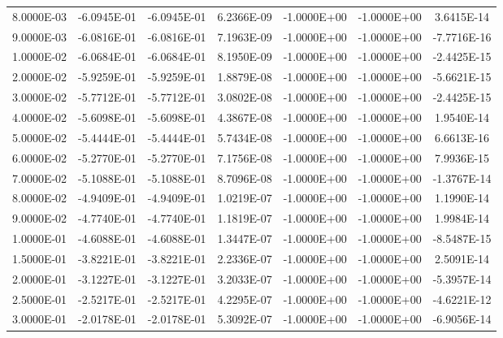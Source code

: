 \documentclass[12pt,letterpaper,reqno]{article}
\numberwithin{equation}{section}
\begin{document}
{\begin{tabular}{|c|c|c|c|c|c|c|}
 8.0000E-03     & -6.0945E-01     & -6.0945E-01     &  6.2366E-09     & -1.0000E+00     & -1.0000E+00     &  3.6415E-14    \\ 
 9.0000E-03     & -6.0816E-01     & -6.0816E-01     &  7.1963E-09     & -1.0000E+00     & -1.0000E+00     & -7.7716E-16    \\ 
 1.0000E-02     & -6.0684E-01     & -6.0684E-01     &  8.1950E-09     & -1.0000E+00     & -1.0000E+00     & -2.4425E-15    \\ 
 2.0000E-02     & -5.9259E-01     & -5.9259E-01     &  1.8879E-08     & -1.0000E+00     & -1.0000E+00     & -5.6621E-15    \\ 
 3.0000E-02     & -5.7712E-01     & -5.7712E-01     &  3.0802E-08     & -1.0000E+00     & -1.0000E+00     & -2.4425E-15    \\ 
 4.0000E-02     & -5.6098E-01     & -5.6098E-01     &  4.3867E-08     & -1.0000E+00     & -1.0000E+00     &  1.9540E-14    \\ 
 5.0000E-02     & -5.4444E-01     & -5.4444E-01     &  5.7434E-08     & -1.0000E+00     & -1.0000E+00     &  6.6613E-16    \\ 
 6.0000E-02     & -5.2770E-01     & -5.2770E-01     &  7.1756E-08     & -1.0000E+00     & -1.0000E+00     &  7.9936E-15    \\ 
 7.0000E-02     & -5.1088E-01     & -5.1088E-01     &  8.7096E-08     & -1.0000E+00     & -1.0000E+00     & -1.3767E-14    \\ 
 8.0000E-02     & -4.9409E-01     & -4.9409E-01     &  1.0219E-07     & -1.0000E+00     & -1.0000E+00     &  1.1990E-14    \\ 
 9.0000E-02     & -4.7740E-01     & -4.7740E-01     &  1.1819E-07     & -1.0000E+00     & -1.0000E+00     &  1.9984E-14    \\ 
 1.0000E-01     & -4.6088E-01     & -4.6088E-01     &  1.3447E-07     & -1.0000E+00     & -1.0000E+00     & -8.5487E-15    \\ 
 1.5000E-01     & -3.8221E-01     & -3.8221E-01     &  2.2336E-07     & -1.0000E+00     & -1.0000E+00     &  2.5091E-14    \\ 
 2.0000E-01     & -3.1227E-01     & -3.1227E-01     &  3.2033E-07     & -1.0000E+00     & -1.0000E+00     & -5.3957E-14    \\ 
 2.5000E-01     & -2.5217E-01     & -2.5217E-01     &  4.2295E-07     & -1.0000E+00     & -1.0000E+00     & -4.6221E-12    \\ 
 3.0000E-01     & -2.0178E-01     & -2.0178E-01     &  5.3092E-07     & -1.0000E+00     & -1.0000E+00     & -6.9056E-14    \\ 

\end{tabular}}
\end{document}
